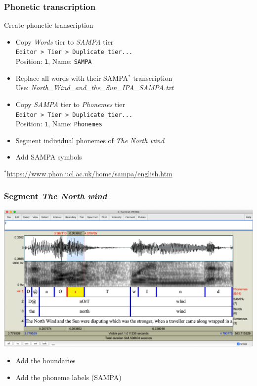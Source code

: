 \documentclass{beamer}
\begin{document}
\begin{frame} 
\frametitle{Phonetic transcription} 
\begin{block}{Create phonetic transcription}
\begin{itemize}
\item Copy \textit{Words} tier to \textit{SAMPA} tier\\
\texttt{Editor > Tier > Duplicate tier...} \\Position: \texttt{1}, Name: \texttt{SAMPA}
\item Replace all words with their SAMPA$^*$ transcription\\ Use: \textit{North\_Wind\_and\_the\_Sun\_IPA\_SAMPA.txt}
\item Copy \textit{SAMPA} tier to \textit{Phonemes} tier\\
      \texttt{Editor > Tier > Duplicate tier...} \\Position: \texttt{1}, Name: \texttt{Phonemes}
\item Segment individual phonemes of \textit{The North wind}
\item Add SAMPA symbols
\end{itemize}
\end{block} 

\scriptsize{$^*$\url{https://www.phon.ucl.ac.uk/home/sampa/english.htm}}
\end{frame}

\begin{frame} 
\frametitle{Segment \textit{The North wind}} 

\includegraphics[width=0.95\framewidth]{img/Phonemes_segmentation}

\begin{itemize}
\item Add the boundaries
\item Add the phoneme labels (SAMPA)
\end{itemize}
\end{frame}
\end{document}

